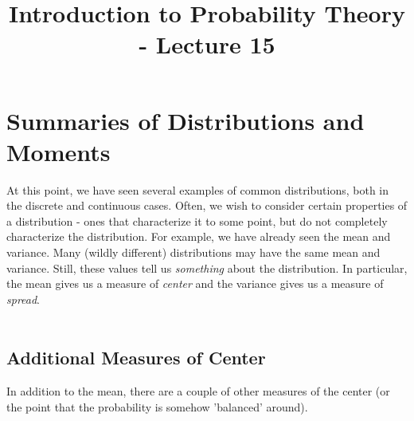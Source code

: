 \documentclass[12pt]{article} %
\date{}
\title{Introduction to Probability Theory - Lecture 15}
\begin{document}
\maketitle

\section{Summaries of Distributions and Moments}
At this point, we have seen several examples of common distributions, both in the discrete and continuous cases. Often, we wish to consider certain properties of a distribution - ones that characterize it to some point, but do not completely characterize the distribution. For example, we have already seen the mean and variance. Many (wildly different) distributions may have the same mean and variance. Still, these values tell us \emph{something} about the distribution. In particular, the mean gives us a measure of \emph{center} and the variance gives us a measure of \emph{spread}.\\\\
\subsection{Additional Measures of Center}
In addition to the mean, there are a couple of other measures of the center (or the point that the probability is somehow 'balanced' around). \\
\end{document}

